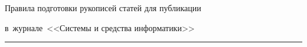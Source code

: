 \def\stat{prav-rus}


{%


\vspace*{-25pt} %


\raggedleft\large \bf%


Правила подготовки рукописей статей для публикации %


в~журнале~<<Системы и средства информатики>>%




\vskip 5pt


    \hrule


    \par




}





\def\rightmark{\ }


\def\leftmark{\ }





\def\tit{\ }





\def\aut{\ }





\def\auf{\ }





\def\leftkol{\ } %





\def\rightkol{\ } %





\titele{\tit}{\aut}{\auf}{\leftkol}{\rightkol}





\vspace*{-72pt}





